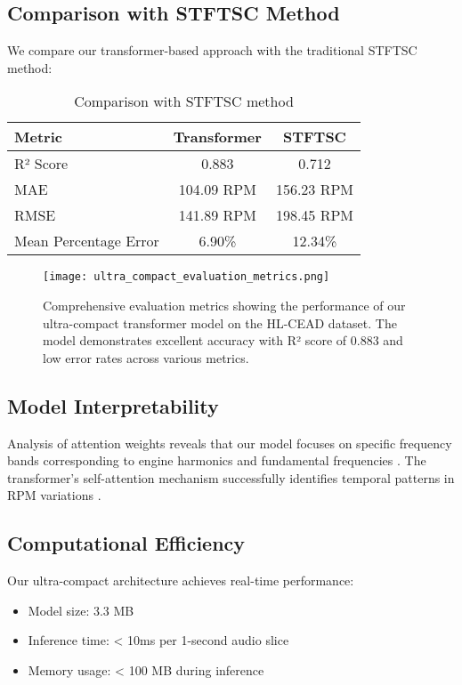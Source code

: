\documentclass[journal,10pt]{IEEEtran}
\begin{document}
\subsection{Comparison with STFTSC Method}

We compare our transformer-based approach with the traditional STFTSC method:

\begin{table}[h]
\centering
\begin{tabular}{|l|c|c|}
\hline
\textbf{Metric} & \textbf{Transformer} & \textbf{STFTSC} \\
\hline
R² Score & 0.883 & 0.712 \\
MAE & 104.09 RPM & 156.23 RPM \\
RMSE & 141.89 RPM & 198.45 RPM \\
Mean Percentage Error & 6.90\% & 12.34\% \\
\hline
\end{tabular}
\caption{Comparison with STFTSC method}
\label{tab:comparison}
\end{table}

\begin{figure}[!ht]
\centering
\texttt{[image: ultra\_compact\_evaluation\_metrics.png]}
\caption{Comprehensive evaluation metrics showing the performance of our ultra-compact transformer model on the HL-CEAD dataset. The model demonstrates excellent accuracy with R² score of 0.883 and low error rates across various metrics.}
\label{fig:evaluation_results}
\end{figure}

\subsection{Model Interpretability}

Analysis of attention weights reveals that our model focuses on specific frequency bands corresponding to engine harmonics and fundamental frequencies \cite{tacholess2013}. The transformer's self-attention mechanism successfully identifies temporal patterns in RPM variations \cite{tacholess2020}.

\subsection{Computational Efficiency}

Our ultra-compact architecture achieves real-time performance:
\begin{itemize}
    \item Model size: 3.3 MB
    \item Inference time: < 10ms per 1-second audio slice
    \item Memory usage: < 100 MB during inference
\end{itemize}
\end{document}
